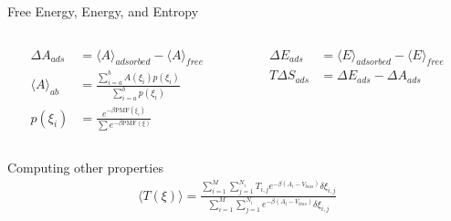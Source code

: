 \documentclass[aspectratio=169, compress]{beamer}
\begin{document}
\begin{frame}{Free Energy, Energy, and Entropy}

\begin{columns}
\begin{column}{.5\textwidth}
\Large
  \begin{align*}
    \Delta A_{ads} &= \langle A \rangle_{adsorbed} - \langle A
    \rangle_{free} \\
    \langle A \rangle_{ab} &= \frac{\sum_{i=a}^b A(\xi_i)  p(\xi_i)
                             }{\sum_{i=a}^b p(\xi_i)} \\
    p(\xi_i) &= \frac{e^{-\beta \mathrm{PMF}(\xi_i)}}{\sum e^{-\beta \mathrm{PMF}(\xi)}}
  \end{align*}
\end{column}
\begin{column}{.5\textwidth}
  \Large
  \begin{align*}
    \Delta E_{ads} &= \langle E \rangle_{adsorbed} - \langle E
                     \rangle_{free} \\
    T\Delta S_{ads} &= \Delta E_{ads} - \Delta A_{ads}
  \end{align*}
\end{column}
\end{columns}
\end{frame}

\begin{frame}{Computing other properties}
\LARGE
  \begin{align*}
\langle T(\xi) \rangle = \frac{\sum_{i=1}^{M} \sum_{j=1}^{N_{i}} T_{i,
  j} e^{-\beta(A_i - V_{bias})} \delta \xi_{i, j}}{\sum_{i=1}^{M} \sum_{j=1}^{N_{i}} e^{-\beta(A_i - V_{bias})} \delta \xi_{i, j}}
\end{align*}
\end{frame}
\end{document}
